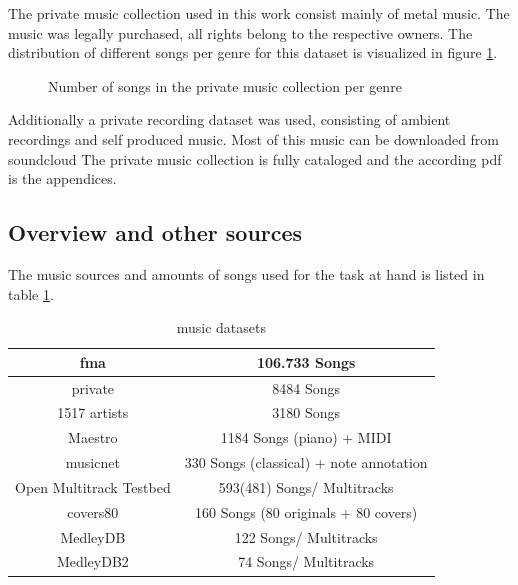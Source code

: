 The private music collection used in this work consist mainly of metal music. The music was legally purchased, all rights belong to the respective owners. The distribution of different songs per genre for this dataset is visualized in figure \ref{privmusdist}.
\begin{figure}[thpb]
	\centering
	\caption{Number of songs in the private music collection per genre}
	\label{privmusdist}
\end{figure}
\FloatBarrier
Additionally a private recording dataset was used, consisting of ambient recordings and self produced music. Most of this music can be downloaded from soundcloud\cite{bqpd1}
The private music collection is fully cataloged and the according pdf is the appendices.

\subsection{Overview and other sources}

The music sources and amounts of songs used for the task at hand is listed in table \ref{table_dsets}.

\begin{table}[h]
	\begin{center}
		\begin{tabular}{|c||c|}
			\hline
			fma & 106.733 Songs\\
			\hline
			private & 8484 Songs\\
			\hline
			1517 artists & 3180 Songs\\
			\hline
			Maestro & 1184 Songs (piano) + MIDI\\
			\hline
			musicnet & 330 Songs (classical) + note annotation\\
			\hline
			Open Multitrack Testbed & 593(481) Songs/ Multitracks\\
			\hline
			covers80 & 160 Songs (80 originals + 80 covers)\\
			\hline
			MedleyDB &  122 Songs/ Multitracks\\
			\hline
			MedleyDB2 &  74 Songs/ Multitracks\\
			\hline
		\end{tabular}
	\end{center}
	\caption{music datasets}
	\label{table_dsets}
\end{table}

